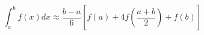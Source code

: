 \[
    \int_{a}^{b} f(x)dx\approx \frac{b-a}{6}\left [ f(a)+4f \left(\frac{a+b}{2} \right)+f(b) \right ]
\]